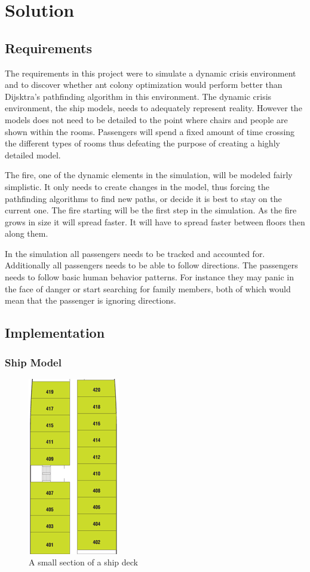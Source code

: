 \chapter{Solution}
\label{ch:solution}

\section{Requirements}

The requirements in this project were to simulate a dynamic crisis environment and to discover whether ant colony optimization would perform better than Dijsktra's pathfinding algorithm in this environment. The dynamic crisis environment, the ship models, needs to adequately represent reality. However the models does not need to be detailed to the point where chairs and people are shown within the rooms. Passengers will spend a fixed amount of time crossing the different types of rooms thus defeating the purpose of creating a highly detailed model. 

The fire, one of the dynamic elements in the simulation, will be modeled fairly simplistic. It only needs to create changes in the model, thus forcing the pathfinding algorithms to find new paths, or decide it is best to stay on the current one. The fire starting will be the first step in the simulation. As the fire grows in size it will spread faster. It will have to spread faster between floors then along them. 

In the simulation all passengers needs to be tracked and accounted for. Additionally all passengers needs to be able to follow directions. The passengers needs to follow basic human behavior patterns. For instance they may panic in the face of danger or start searching for family members, both of which would mean that the passenger is ignoring directions.

\section{Implementation}

\subsection{Ship Model}

\begin{figure} [h]
\centering
\includegraphics[angle=90]{images/rooms.png}
\caption{A small section of a ship deck}
\label{fig:rooms}
\end{figure}

